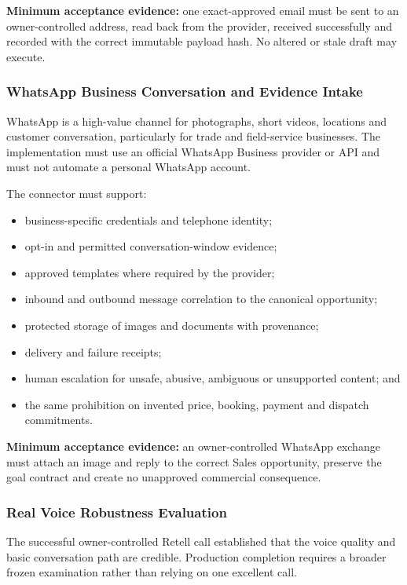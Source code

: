 \textbf{Minimum acceptance evidence:} one exact-approved email must be sent to
an owner-controlled address, read back from the provider, received successfully
and recorded with the correct immutable payload hash.  No altered or stale draft
may execute.

\subsubsection{WhatsApp Business Conversation and Evidence Intake}

WhatsApp is a high-value channel for photographs, short videos, locations and
customer conversation, particularly for trade and field-service businesses.
The implementation must use an official WhatsApp Business provider or API and
must not automate a personal WhatsApp account.

The connector must support:

\begin{itemize}[leftmargin=*]
  \item business-specific credentials and telephone identity;
  \item opt-in and permitted conversation-window evidence;
  \item approved templates where required by the provider;
  \item inbound and outbound message correlation to the canonical opportunity;
  \item protected storage of images and documents with provenance;
  \item delivery and failure receipts;
  \item human escalation for unsafe, abusive, ambiguous or unsupported content; and
  \item the same prohibition on invented price, booking, payment and dispatch commitments.
\end{itemize}

\textbf{Minimum acceptance evidence:} an owner-controlled WhatsApp exchange
must attach an image and reply to the correct Sales opportunity, preserve the
goal contract and create no unapproved commercial consequence.

\subsubsection{Real Voice Robustness Evaluation}

The successful owner-controlled Retell call established that the voice quality
and basic conversation path are credible.  Production completion requires a
broader frozen examination rather than relying on one excellent call.

